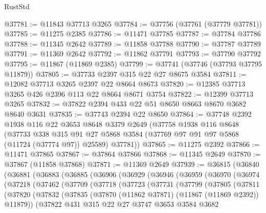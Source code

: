 \begin{lexlean}{RustStd}
\begin{coremodule}
@37781 := @11843 @37713 @3265
@37784 := @37756 (@37761 (@37779 @37781))
@37785 := @11275 @2385
@37786 := @11471 @37785
@37787 := @37784 @37786
@37788 := @11345 @2642
@37789 := @11858 @37788
@37790 := @37787 @37789
@37791 := @11369 @2642
@37792 := @11862 @37791
@37793 := @37790 @37792
@37795 := @11867 (@11869 @2385)
@37799 := @37741 (@37746 (@37793 @37795 @11879))
@37805 := @37733 @2397 @315 @22 @27 @8675 @3584
@37811 := @12082 @37713 @3265 @2397 @22 @8664 @8673
@37820 := @12385 @37713 @3265 @426 @2396 @113 @22 @8664 @8671 @3754
@37822 := @12399 @37713 @3265
@37832 := @37822 @2394 @433 @22 @51 @8650 @8663 @8670 @3682 @8640 @3631
@37835 := @37743 @2394 @22 @8650
@37864 := @37748
    @2392
    @1938
    @116
    @22
    @3653
    @8648
    @3379
    @2649
    (@37758
      @1938
      @116
      @8648
      (@37733
        @338
        @315
        @91
        @27
        @5868
        @3584
        (@37769 @97 @91 @97 @5868 (@11724 (@37774 @97)) @25589)
        @37781))
@37865 := @11275 @2392
@37866 := @11471 @37865
@37867 := @37864 @37866
@37868 := @11345 @2649
@37870 := @37867 (@11858 @37868)
@37871 := @11369 @2649
@37939 := @36815
    (@36840
      (@36881
        (@36883
          (@36885
            (@36906
              (@36929
                (@36946
                  (@36959
                    (@36970
                      (@36974
                        (@37218
                          (@37462
                            (@37709
                              (@37718
                                (@37723
                                  (@37731
                                    (@37799
                                      (@37805
                                        (@37811
                                          (@37820
                                            (@37832
                                              (@37835
                                                (@37870
                                                  (@11862 @37871)
                                                  (@11867 (@11869 @2392))
                                                  @11879))
                                              (@37822
                                                @431
                                                @315
                                                @22
                                                @27
                                                @3747
                                                @3653
                                                @3584
                                                @3682

\end{coremodule}
\end{lexlean}
